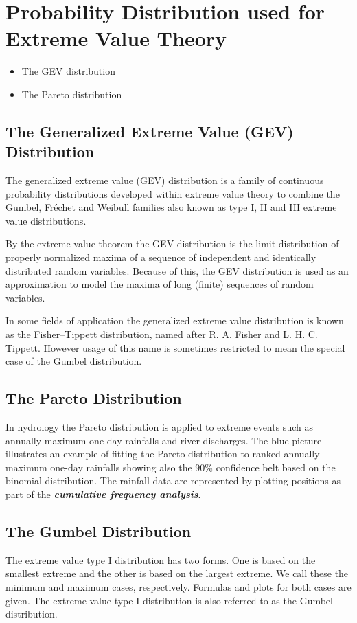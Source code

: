 \newpage
\section{Probability Distribution used for Extreme Value Theory}
\begin{itemize}
\item The GEV distribution
\item The Pareto distribution
\end{itemize}
\subsection{The Generalized Extreme Value (GEV) Distribution}
The generalized extreme value (GEV) distribution is a family of continuous probability distributions developed within extreme value theory to combine the Gumbel, Fréchet and Weibull families also known as type I, II and III extreme value distributions.

By the extreme value theorem the GEV distribution is the limit distribution of properly normalized maxima of a sequence of independent and identically distributed random variables. Because of this, the GEV distribution is used as an approximation to model the maxima of long (finite) sequences of random variables.

In some fields of application the generalized extreme value distribution is known as the Fisher–Tippett distribution, named after R. A. Fisher and L. H. C. Tippett. However usage of this name is sometimes restricted to mean the special case of the Gumbel distribution.
\subsection{The Pareto Distribution}

In hydrology the Pareto distribution is applied to extreme events such as annually maximum one-day rainfalls and river discharges. The blue picture illustrates an example of fitting the Pareto distribution to ranked annually maximum one-day rainfalls showing also the 90\% confidence belt based on the binomial distribution. The rainfall data are represented by plotting positions as part of the  \textbf{\emph{cumulative frequency analysis}}.

\subsection{The Gumbel Distribution}
The extreme value type I distribution has two forms. One is based
on the smallest extreme and the other is based on the largest
extreme. We call these the minimum and maximum cases,
respectively. Formulas and plots for both cases are given. The
extreme value type I distribution is also referred to as the
Gumbel distribution.

